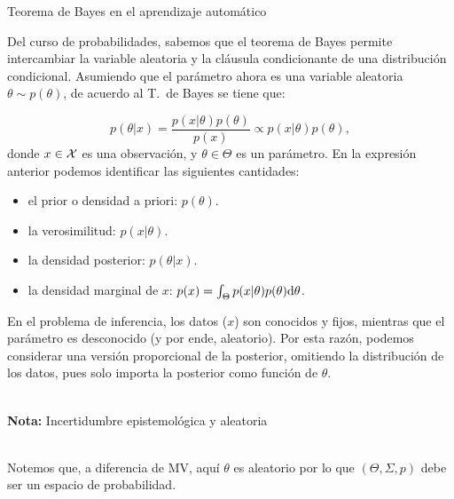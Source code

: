 \documentclass[9pt, handout]{beamer}
\begin{document}
\begin{frame}{Teorema de Bayes en el aprendizaje automático}

Del curso de probabilidades, sabemos que el teorema de Bayes permite intercambiar la variable aleatoria y la cláusula condicionante de una distribución condicional. Asumiendo que el parámetro  ahora es una variable aleatoria $\theta\sim p(\theta)$, de acuerdo al T.~de Bayes se tiene que:

\begin{equation*}
	p(\theta|x) = \frac{p(x|\theta)p(\theta)}{p(x)} \propto p(x|\theta)p(\theta),\label{eq:Bayes}
\end{equation*}
donde $x\in{\mathcal X}$ es una observación, y $\theta\in\Theta$ es un parámetro. \pause En la expresión anterior podemos identificar las siguientes cantidades:
\begin{itemize}
	\item el prior o densidad a priori: $p(\theta)$. \pause
	\item la verosimilitud: $p(x|\theta)$. \pause
	\item la densidad posterior: $p(\theta|x)$. \pause
	\item la densidad marginal de $x$: $p(x) = \int_\Theta p(x|\theta)p(\theta){\text d}\theta$. \pause
\end{itemize} 

En el problema de inferencia, los datos ($x$) son conocidos y fijos, mientras que el parámetro es desconocido (y por ende, aleatorio). Por esta razón, podemos considerar una versión proporcional de la posterior, omitiendo la distribución de los datos, pues solo importa la posterior como función de $\theta$.\\~\ \pause

\textbf{Nota:} Incertidumbre epistemológica y aleatoria\\~\

Notemos que, a diferencia de MV, aquí $\theta$ es aleatorio por lo que $(\Theta,  \Sigma, p)$ debe ser un espacio de probabilidad.
\end{frame}
\end{document}

